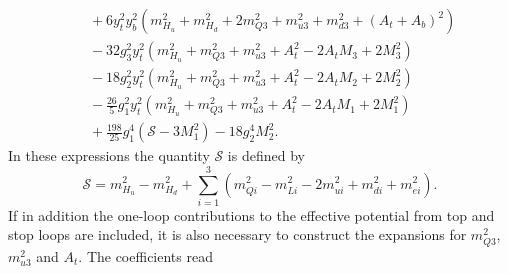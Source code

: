 \documentclass[preprint,amsmath,amssymb,aps,superscriptaddress,prd,showpacs,floatfix,nofootinbib]{revtex4-1}
\begin{document}
\begin{subequations}
\begin{align}
&\quad{}+6y_t^2y_b^2\left ( m_{H_u}^2+m_{H_d}^2+2m_{Q3}^2+m_{u3}^2+m_{d3}^2+(A_t+A_b)^2\right )\nonumber\\
&\quad{}-32g_3^2y_t^2\left ( m_{H_u}^2+m_{Q3}^2+m_{u3}^2+A_t^2-2A_tM_3+2M_3^2\right )\nonumber\\
&\quad{}-18g_2^2y_t^2\left ( m_{H_u}^2+m_{Q3}^2+m_{u3}^2+A_t^2-2A_tM_2+2M_2^2\right )\nonumber\\
&\quad{}-\frac{26}{5}g_1^2y_t^2\left ( m_{H_u}^2+m_{Q3}^2+m_{u3}^2+A_t^2-2A_tM_1+2M_1^2\right )\nonumber\\
&\quad{}+\frac{198}{25}g_1^4\left ( \mathcal{S}-3M_1^2\right )-18g_2^4M_2^2.\label{eq:MSSMmHu2b2}
\end{align}
\end{subequations}
In these expressions the quantity $\mathcal{S}$ is defined by
\begin{equation}\label{eq:MSSMgaugeBetaContribution}
\mathcal{S}=m_{H_u}^2-m_{H_d}^2+\sum_{i=1}^3\left ( m_{Qi}^2-m_{Li}^2-2m_{ui}^2+m_{di}^2+m_{ei}^2\right ).
\end{equation}
If in addition the one-loop contributions to the effective potential
from top and stop loops are included, it is also necessary to
construct the expansions for $m_{Q3}^2$, $m_{u3}^2$ and $A_t$. The
coefficients read
\end{document}
